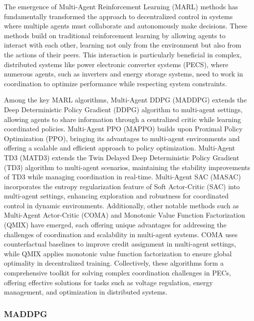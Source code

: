 The emergence of Multi-Agent Reinforcement Learning (MARL) methods has fundamentally transformed the approach to decentralized control in systems where multiple agents must collaborate and autonomously make decisions. These methods build on traditional reinforcement learning by allowing agents to interact with each other, learning not only from the environment but also from the actions of their peers. This interaction is particularly beneficial in complex, distributed systems like power electronic converter systems (PECS), where numerous agents, such as inverters and energy storage systems, need to work in coordination to optimize performance while respecting system constraints.

Among the key MARL algorithms, Multi-Agent DDPG (MADDPG) \cite{lowe2017multi} extends the Deep Deterministic Policy Gradient (DDPG) algorithm to multi-agent settings, allowing agents to share information through a centralized critic while learning coordinated policies. Multi-Agent PPO (MAPPO) \cite{yu2022surprising} builds upon Proximal Policy Optimization (PPO), bringing its advantages to multi-agent environments and offering a scalable and efficient approach to policy optimization. Multi-Agent TD3 (MATD3) \cite{ackermann2019reducing} extends the Twin Delayed Deep Deterministic Policy Gradient (TD3) algorithm to multi-agent scenarios, maintaining the stability improvements of TD3 while managing coordination in real-time. Multi-Agent SAC (MASAC) \cite {kuba2021trust} incorporates the entropy regularization feature of Soft Actor-Critic (SAC) into multi-agent settings, enhancing exploration and robustness for coordinated control in dynamic environments. Additionally, other notable methods such as Multi-Agent Actor-Critic (COMA) \cite{foerster2018counterfactual} and Monotonic Value Function Factorization (QMIX) \cite{rashid2020monotonic} have emerged, each offering unique advantages for addressing the challenges of coordination and scalability in multi-agent systems. COMA uses counterfactual baselines to improve credit assignment in multi-agent settings, while QMIX applies monotonic value function factorization to ensure global optimality in decentralized training. Collectively, these algorithms form a comprehensive toolkit for solving complex coordination challenges in PECs, offering effective solutions for tasks such as voltage regulation, energy management, and optimization in distributed systems.

\subsubsection{MADDPG}

